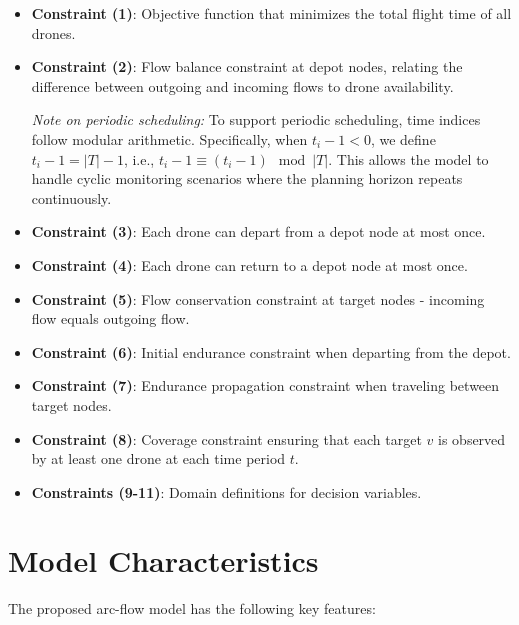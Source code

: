\documentclass[preprint,review,12pt,3p,authoryear]{elsarticle}
\begin{document}
\begin{itemize}
    \item \textbf{Constraint (1)}: Objective function that minimizes the total flight time of all drones.
    \item \textbf{Constraint (2)}: Flow balance constraint at depot nodes, relating the difference between outgoing and incoming flows to drone availability.
    
    \textit{Note on periodic scheduling:} To support periodic scheduling, time indices follow modular arithmetic. Specifically, when $t_i - 1 < 0$, we define $t_i - 1 = |T| - 1$, i.e., $t_i - 1 \equiv (t_i - 1) \mod |T|$. This allows the model to handle cyclic monitoring scenarios where the planning horizon repeats continuously.
    \item \textbf{Constraint (3)}: Each drone can depart from a depot node at most once.
    \item \textbf{Constraint (4)}: Each drone can return to a depot node at most once.
    \item \textbf{Constraint (5)}: Flow conservation constraint at target nodes - incoming flow equals outgoing flow.
    \item \textbf{Constraint (6)}: Initial endurance constraint when departing from the depot.
    \item \textbf{Constraint (7)}: Endurance propagation constraint when traveling between target nodes.
    \item \textbf{Constraint (8)}: Coverage constraint ensuring that each target $v$ is observed by at least one drone at each time period $t$.
    \item \textbf{Constraints (9-11)}: Domain definitions for decision variables.
\end{itemize}

\section{Model Characteristics}

The proposed arc-flow model has the following key features:
\end{document}
